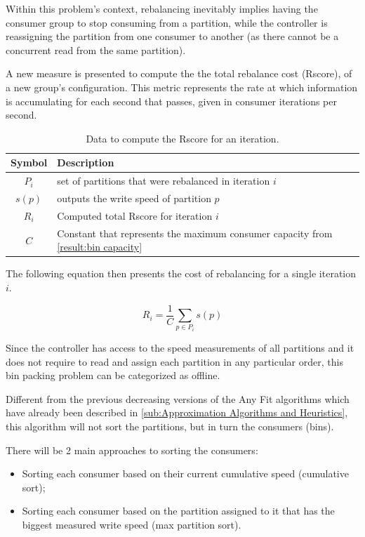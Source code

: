 Within this problem's context, rebalancing inevitably implies having the
consumer group to stop consuming from a partition, while the controller is
reassigning the partition from one consumer to another (as there cannot be a
concurrent read from the same partition).

A new measure is presented to compute the the total rebalance cost (Rscore), of
a new group's configuration. This metric represents the rate at which
information is accumulating for each second that passes, given in consumer
iterations per second.

\begin{table}[H] \centering \caption{Data to compute the Rscore for an
    iteration.} \begin{tabular}{ |c|l| } \hline \textbf{Symbol} &
        \textbf{Description} \\ \hline $P_i$ & set of partitions that were
        rebalanced in iteration $i$ \\ $s(p)$ & outputs the write speed of
        partition $p$ \\ $R_i$  & Computed total Rscore for iteration $i$ \\ $C$
    &  Constant that represents the maximum consumer capacity from
    \ref{result:bin capacity}\\ \hline \end{tabular} \end{table}

The following equation then presents the cost of rebalancing for a single
    iteration $i$.

\begin{equation} R_i = \frac{1}{C}\sum_{p \in P_i} s(p) \end{equation}

Since the controller has access to the speed measurements of all partitions and
    it does not require to read and assign each partition in any particular
    order, this bin packing problem can be categorized as offline.

Different from the previous decreasing versions of the Any Fit algorithms which
    have already been described in \ref{sub:Approximation Algorithms and
    Heuristics}, this algorithm will not sort the partitions, but in turn the
    consumers (bins).

There will be 2 main approaches to sorting the consumers: \begin{itemize} \item
        Sorting each consumer based on their current cumulative speed
    (cumulative sort); \item Sorting each consumer based on the partition
        assigned to it that has the biggest measured write speed (max partition
        sort).  \end{itemize}

